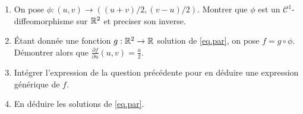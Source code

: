 \documentclass[a4paper]{tp_um}
\begin{document}
\begin{enumerate}
    \item On pose $\phi : (u,v)  \to ((u+v)/2,(v-u)/2)$. Montrer que $\phi$ est un $\mathcal C^1$-diffeomorphisme sur $\mathbb{R}^2$ et preciser son inverse. 
        \blanc{6cm}
        


        

    \item Étant donnée une fonction $g:\mathbb{R}^2\to\mathbb{R}$ solution de \eqref{eq.par}, on pose $f = g \circ \phi %
        $. Démontrer alors que $\frac{\partial f}{\partial u}(u,v) = \frac a 2$.
        \blanc{8cm}
        


    \item Intégrer l'expression de la question précédente pour en déduire une expression générique de $f$.
        \blanc{6cm}




    \item En déduire les solutions de \eqref{eq.par}.
        \blanc{5cm}


\end{enumerate}
\end{document}

